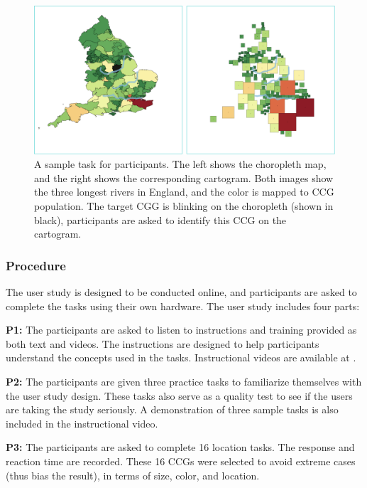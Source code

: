 {
\begin{figure}[tb!]
    \centering
    \includegraphics[width=\columnwidth,keepaspectratio]{figure/evaluation/task.png}
    \caption{A sample task for participants. The left shows the choropleth map, and the right shows the corresponding cartogram. Both images show the three longest rivers in England, and the color is mapped to CCG population. The target CGG is blinking on the choropleth (shown in black), participants are asked to identify this CCG on the cartogram.}
    \label{fig:task}
\end{figure}
}

\subsubsection{Procedure}

The user study is designed to be conducted online, and participants are asked to complete the tasks using their own hardware. The user study includes four parts:

\textbf{P1:} The participants are asked to listen to instructions and training provided as both text and videos. The instructions are designed to help participants understand the concepts used in the tasks. Instructional videos are available at .

\textbf{P2:} The participants are given three practice tasks to familiarize themselves with the user study design. These tasks also serve as a quality test to see if the users are taking the study seriously. A demonstration of three sample tasks is also included in the instructional video.

\textbf{P3:} The participants are asked to complete 16 location tasks. The response and reaction time are recorded. These 16 CCGs were selected to avoid extreme cases (thus bias the result), in terms of size, color, and location.

